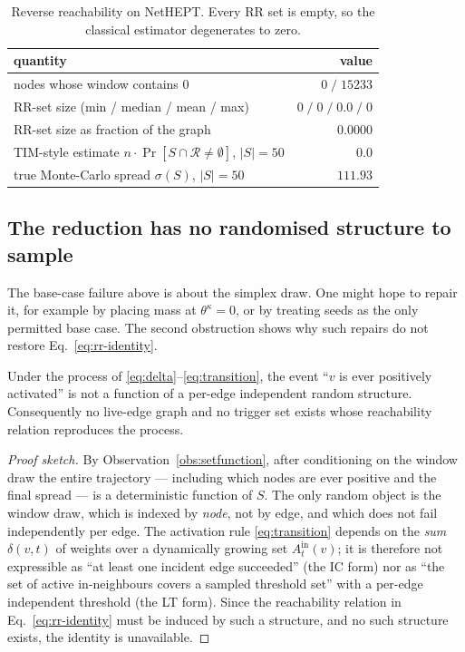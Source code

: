 \begin{table}[t]
\centering
\caption{Reverse reachability on NetHEPT. Every RR set is empty, so the classical estimator
degenerates to zero.}
\label{tab:rr}
\begin{tabular}{lr}
\toprule
quantity & value \\
\midrule
nodes whose window contains $0$ & $0 \;/\; 15233$ \\
RR-set size (min / median / mean / max) & $0 \;/\; 0 \;/\; \mathbf{0.0} \;/\; 0$ \\
RR-set size as fraction of the graph & $0.0000$ \\
TIM-style estimate $n \cdot \Pr[S \cap \mathcal{R} \neq \emptyset]$, $|S| = 50$ & $\mathbf{0.0}$ \\
true Monte-Carlo spread $\sigma(S)$, $|S| = 50$ & $111.93$ \\
\bottomrule
\end{tabular}
\end{table}

\subsection{The reduction has no randomised structure to sample}

The base-case failure above is about the simplex draw. One might hope to repair it, for example
by placing mass at $\theta^\kappa = 0$, or by treating seeds as the only permitted base case.
The second obstruction shows why such repairs do not restore Eq.~\eqref{eq:rr-identity}.

\begin{proposition}
\label{prop:nofactor}
Under the process of \eqref{eq:delta}--\eqref{eq:transition}, the event ``$v$ is ever positively
activated'' is not a function of a per-edge independent random structure. Consequently no
live-edge graph and no trigger set exists whose reachability relation reproduces the process.
\end{proposition}

\begin{proof}[Proof sketch]
By Observation~\ref{obs:setfunction}, after conditioning on the window draw the entire trajectory
--- including which nodes are ever positive and the final spread --- is a deterministic function
of $S$. The only random object is the window draw, which is indexed by \emph{node}, not by edge,
and which does not fail independently per edge. The activation rule \eqref{eq:transition} depends
on the \emph{sum} $\delta(v,t)$ of weights over a dynamically growing set
$A^{\mathrm{in}}_t(v)$; it is therefore not expressible as ``at least one incident edge
succeeded'' (the IC form) nor as ``the set of active in-neighbours covers a sampled threshold
set'' with a per-edge independent threshold (the LT form). Since the reachability relation in
Eq.~\eqref{eq:rr-identity} must be induced by such a structure, and no such structure exists, the
identity is unavailable.
\end{proof}

